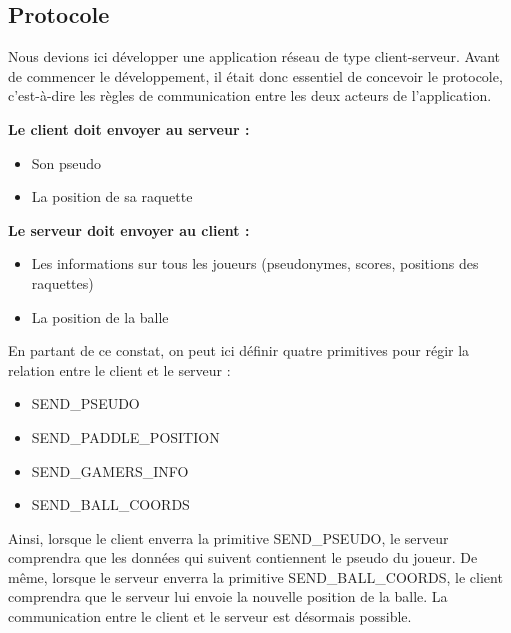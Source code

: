 \documentclass[a4paper,12pt]{article}
\begin{document}
\subsection{Protocole}

Nous devions ici développer une application réseau de type client-serveur. Avant de commencer le développement, il était donc essentiel de concevoir le protocole, c'est-à-dire les règles de communication entre les deux acteurs de l'application.

\textbf{Le client doit envoyer au serveur :}
\begin{itemize}
 \item{Son pseudo}
 \item{La position de sa raquette}
\end{itemize}

\vspace{7pt}

\textbf{Le serveur doit envoyer au client :}
\begin{itemize}
 \item{Les informations sur tous les joueurs (pseudonymes, scores, positions des raquettes)}
 \item{La position de la balle}
\end{itemize}

\vspace{7pt}

En partant de ce constat, on peut ici définir quatre primitives pour régir la relation entre le client et le serveur :

\begin{itemize}
 \item{SEND\_PSEUDO}
 \item{SEND\_PADDLE\_POSITION}
 \item{SEND\_GAMERS\_INFO}
 \item{SEND\_BALL\_COORDS}
\end{itemize}

Ainsi, lorsque le client enverra la primitive SEND\_PSEUDO, le serveur comprendra que les données qui suivent contiennent le pseudo du joueur. De même, lorsque le serveur enverra la primitive SEND\_BALL\_COORDS, le client comprendra que le serveur lui envoie la nouvelle position de la balle. La communication entre le client et le serveur est désormais possible.
\end{document}
